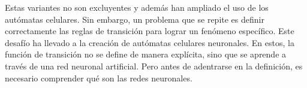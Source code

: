 Estas variantes no son excluyentes y además han ampliado el uso de los autómatas celulares. Sin embargo, un problema que se repite es definir correctamente las reglas de transición para lograr un fenómeno específico. Este desafío ha llevado a la creación de autómatas celulares neuronales. En estos, la función de transición no se define de manera explícita, sino que se aprende a través de una red neuronal artificial. Pero antes de adentrarse en la definición, es necesario comprender qué son las redes neuronales.

\clearpage